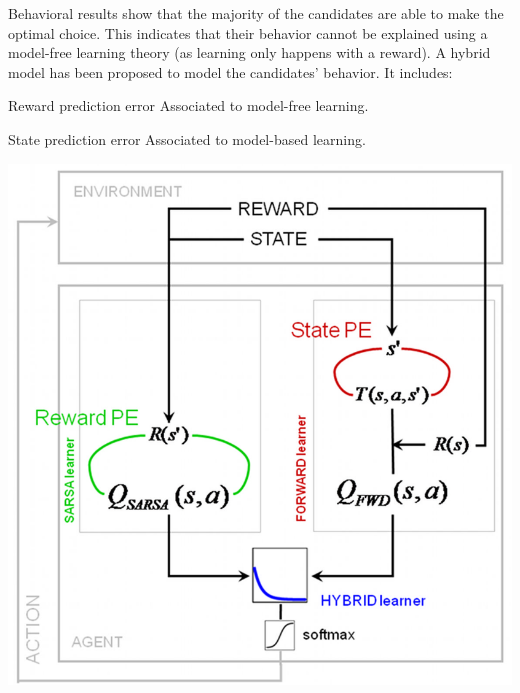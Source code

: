\begin{casestudy}
    \begin{minipage}{0.7\linewidth}
        Behavioral results show that the majority of the candidates are able to make the optimal choice.
        This indicates that their behavior cannot be explained using a model-free learning theory (as learning only happens with a reward).
        A hybrid model has been proposed to model the candidates' behavior. It includes:
        \begin{descriptionlist}
            \item[Reward prediction error] Associated to model-free learning.
            \item[State prediction error] Associated to model-based learning.
        \end{descriptionlist}
    \end{minipage}
    \begin{minipage}{0.3\linewidth}
        \centering
        \includegraphics[width=\linewidth]{./img/human_latent_experiment3.png}
    \end{minipage}\\[1em]


\end{casestudy}
